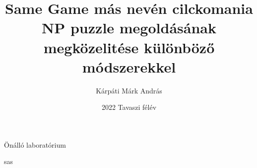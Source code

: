 \documentclass{article}
\title{Same Game más nevén cilckomania NP puzzle megoldásának megközelitése különböző módszerekkel}
\author{Kárpáti Márk András}
\date{2022 Tavaszi félév}
\begin{document}
	
	\maketitle
	
	Önálló laboratórium
	
	sas
\end{document}
